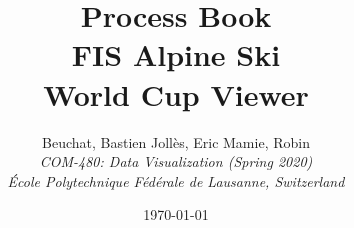 \title{
    Process Book
    \vspace*{3.0cm}\\
    FIS Alpine Ski\\
    World Cup Viewer
}

\author{
    {\Large Beuchat, Bastien \hspace{1cm} Jollès, Eric \hspace{1cm} Mamie, Robin}
    \vspace*{0.5em}\\
    \textit{COM-480: Data Visualization (Spring 2020)}\\
    \textit{École Polytechnique Fédérale de Lausanne, Switzerland}
}

\date{\today}
